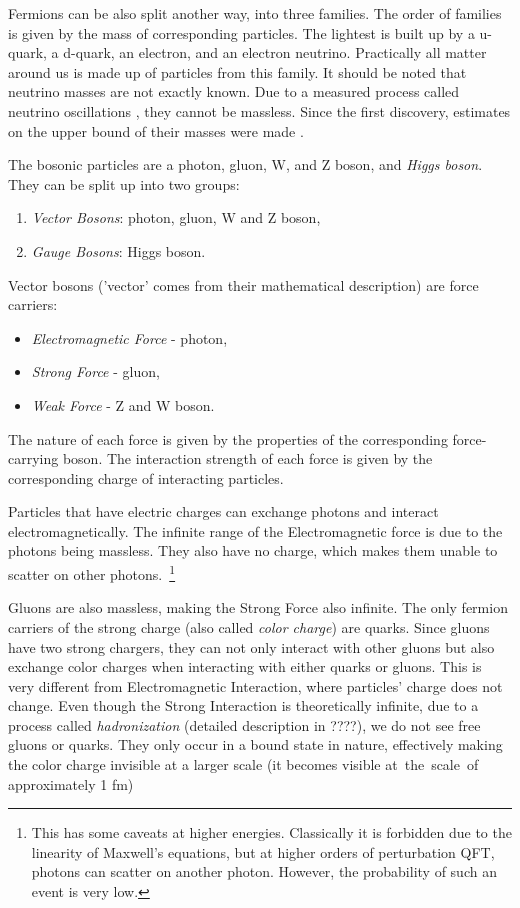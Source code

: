 Fermions can be also split another way, into three families. 
The order of families is given by the mass of corresponding particles.
The lightest is built up by a u-quark, a d-quark, an electron, and an electron neutrino.
Practically all matter around us is made up of particles from this family.
It should be noted that neutrino masses are not exactly known.
Due to a measured process \cite{sadbury} called neutrino oscillations \cite{pdg}, they cannot be massless.
Since the first discovery, estimates on the upper bound of their masses were made \cite{pdg}.

The bosonic particles are a photon, gluon, W, and Z boson, and \emph{Higgs boson}. They can be split up into two groups:
\begin{enumerate}
    \item \emph{Vector Bosons}: photon, gluon, W and Z boson,
    \item \emph{Gauge Bosons}: Higgs boson.
\end{enumerate}
Vector bosons ('vector' comes from their mathematical description) are force carriers:
\begin{itemize}
    \item \emph{Electromagnetic Force} - photon,
    \item \emph{Strong Force} - gluon,
    \item \emph{Weak Force} - Z and W boson.
\end{itemize}
The nature of each force is given by the properties of the corresponding force-carrying boson.
The interaction strength of each force is given by the corresponding charge of interacting particles.

Particles that have electric charges can exchange photons and interact electromagnetically.
The infinite range of the Electromagnetic force is due to the photons being massless.
They also have no charge, which makes them unable to scatter on other photons.~\footnote{This has some caveats at higher energies. Classically it is forbidden due to the linearity of Maxwell's equations, but at higher orders of perturbation QFT, photons can scatter on another photon. However, the probability of such an event is very low.}

Gluons are also massless, making the Strong Force also infinite.
The only fermion carriers of the strong charge (also called \emph{color charge}) are quarks. 
Since gluons have two strong chargers, they can not only interact with other gluons but also exchange color charges when interacting with either quarks or gluons.
This is very different from Electromagnetic Interaction, where particles' charge does not change. 
Even though the Strong Interaction is theoretically infinite, due to a process called \emph{hadronization} (detailed description in ????), we do not see free gluons or quarks. 
They only occur in a bound state in nature, effectively making the color charge invisible at a larger scale (it becomes visible at~the~scale~of approximately 1 fm)

